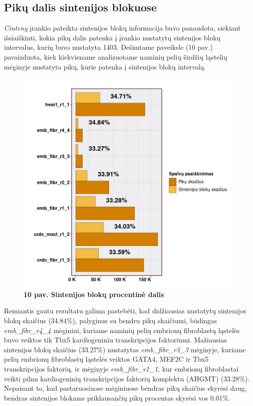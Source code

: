\documentclass[12pt]{article}
\begin{document}
\newpage

\subsection{Pikų dalis sintenijos blokuose}
\emph{Cinteny} įrankio pateikta sintenijos blokų informacija buvo panaudota,
siekiant išsiaiškinti, kokia pikų dalis patenka į įrankio nustatytų sintenijos
blokų intervalus, kurių buvo nustatyta 1403. Dešimtame paveiksle (10 pav.)
pavaizduota, kiek kiekviename analizuotame naminių pelių širdžių ląstelių
mėginyje nustatyta pikų, kurie patenka į sintenijos blokų intervalą.

\begin{figure}[htb]
    \begin{center}
        \includegraphics[width=0.7\linewidth]{../Figures/Synteny_blocks_peaks.png}
        \vspace{-2\baselineskip}
        \caption*{\small\textbf{10 pav. Sintenijos blokų procentinė dalis}}
        \label{fig:10}
    \end{center}
\end{figure}

Remiantis gautu rezultatu galima pastebėti, kad didžiausias nustatytų sintenijos
blokų skaičius (34.84\%), palyginus su bendru pikų skaičiumi, būdingas
\emph{emb\_fibr\_r4\_4} mėginiui, kuriame naminių pelių embrionų fibroblastų
ląstelės buvo veiktos tik Tbx5 kardiogeniniu transkripcijos faktoriumi.
Mažiausias sintenijos blokų skaičius (33.27\%) nustatytas
\emph{emb\_fibr\_r3\_3} mėginyje, kuriame pelių embrionų fibroblastų ląstelės
veiktos GATA4, MEF2C ir Tbx5 transkripcijos faktorių, ir mėginyje
\emph{emb\_fibr\_r1\_1}, kur embrionų fibroblastai veikti pilnu kardiogeninių
trans\-krip\-ci\-jos faktorių komplektu (AHGMT) (33.28\%). Nepaisant to, kad
pastaruosiuose mėginiuose bendras pikų skaičius skyrėsi daug, bendras sintenijos
blokams priklausančių pikų procentas skyrėsi vos 0.01\%.
\end{document}
